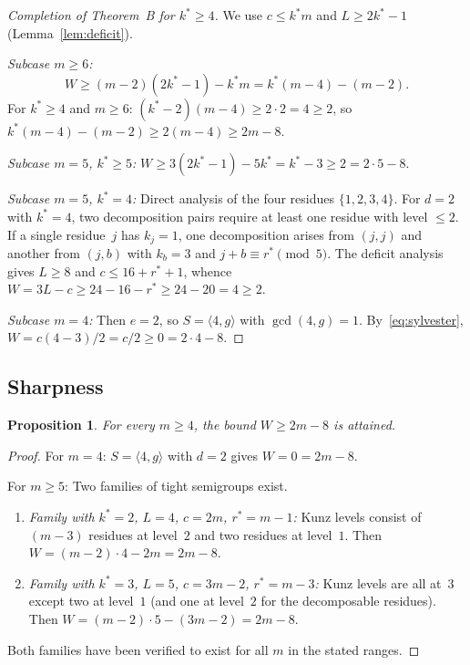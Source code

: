 \documentclass[11pt]{amsart}
\newtheorem{proposition}[theorem]{Proposition}
\theoremstyle{definition}
\theoremstyle{remark}
\begin{document}
\begin{proof}[Completion of Theorem~B for $k^* \ge 4$]
We use $c \le k^* m$ and $L \ge 2k^* - 1$ (Lemma~\ref{lem:deficit}).

\medskip
\emph{Subcase $m \ge 6$:}
\[
  W \ge (m - 2)(2k^* - 1) - k^* m = k^*(m - 4) - (m - 2).
\]
For $k^* \ge 4$ and $m \ge 6$:
$(k^* - 2)(m - 4) \ge 2 \cdot 2 = 4 \ge 2$,
so $k^*(m - 4) - (m - 2) \ge 2(m - 4) \ge 2m - 8$.

\medskip
\emph{Subcase $m = 5$, $k^* \ge 5$:}
$W \ge 3(2k^* - 1) - 5k^* = k^* - 3 \ge 2 = 2 \cdot 5 - 8$.

\medskip
\emph{Subcase $m = 5$, $k^* = 4$:}
Direct analysis of the four residues $\{1, 2, 3, 4\}$.
For $d = 2$ with $k^* = 4$, two decomposition pairs require at least one
residue with level $\le 2$.  If a single residue~$j$ has $k_j = 1$,
one decomposition arises from $(j, j)$ and another from $(j, b)$
with $k_b = 3$ and $j + b \equiv r^* \pmod{5}$.
The deficit analysis gives $L \ge 8$ and $c \le 16 + r^* + 1$,
whence $W = 3L - c \ge 24 - 16 - r^* \ge 24 - 20 = 4 \ge 2$.

\medskip
\emph{Subcase $m = 4$:}
Then $e = 2$, so $S = \langle 4, g \rangle$ with $\gcd(4, g) = 1$.
By~\eqref{eq:sylvester}, $W = c(4 - 3)/2 = c/2 \ge 0 = 2 \cdot 4 - 8$.
\end{proof}

\subsection{Sharpness}

\begin{proposition}\label{prop:tight-B}
For every $m \ge 4$, the bound $W \ge 2m - 8$ is attained.
\end{proposition}

\begin{proof}
For $m = 4$: $S = \langle 4, g \rangle$ with $d = 2$ gives $W = 0 = 2m - 8$.

For $m \ge 5$: Two families of tight semigroups exist.
\begin{enumerate}[nosep]
  \item \emph{Family with $k^* = 2$, $L = 4$, $c = 2m$, $r^* = m - 1$:}
    Kunz levels consist of $(m - 3)$ residues at level~$2$ and two
    residues at level~$1$.  Then $W = (m-2) \cdot 4 - 2m = 2m - 8$.
  \item \emph{Family with $k^* = 3$, $L = 5$, $c = 3m - 2$, $r^* = m - 3$:}
    Kunz levels are all at~$3$ except two at level~$1$ (and one at level~$2$
    for the decomposable residues).  Then $W = (m-2) \cdot 5 - (3m - 2) = 2m - 8$.
\end{enumerate}
Both families have been verified to exist for all $m$ in the stated ranges.
\end{proof}
\end{document}
